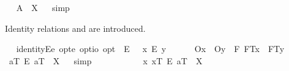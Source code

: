 \begin{isabellebody}
\isanewline
\ \isamarkupfalse%
\ {\isachardoublequoteopen}A{\isacharbang}\ {\isacharequal}\ X{\isachardoublequoteclose}%
\isadelimproof
\ %
\endisadelimproof
%
\isatagproof
{}\isamarkupfalse%
\ simp\ \isamarkupfalse%
\ \ \ \ \ \ \ %
%
\endisatagproof
{\isafoldproof}%
%
\isadelimproof
%
\endisadelimproof
%
\begin{isamarkuptext}%
Identity relations  and \isa{\isactrlbold {\isacharequal}} are introduced.%
\end{isamarkuptext}%
\isamarkuptrue%
\ \isamarkupfalse%
\ identityE{\isacharcolon}{\isacharcolon}{\isachardoublequoteopen}e\ opt{\isasymRightarrow}e\ opt{\isasymRightarrow}io\ opt{\isachardoublequoteclose}\ {\isacharparenleft}\ {\isachardoublequoteopen}\isactrlbold {\isacharequal}\isactrlsub E{\isachardoublequoteclose}\ {}{}{\isacharparenright}\ \ {\isachardoublequoteopen}x\ \isactrlbold {\isacharequal}\isactrlsub E\ y\ {\isasymequiv}\ \isanewline
\ \ \ \ {\isasymlparr}O{\isacharbang}{\isacharcomma}x{\isasymrparr}\ \isactrlbold {\isasymand}\ {\isasymlparr}O{\isacharbang}{\isacharcomma}y{\isasymrparr}\ \isactrlbold {\isasymand}\ \isactrlbold {\isasymbox}{\isacharparenleft}\isactrlbold {\isasymforall}F{\isachardot}\ {\isasymlparr}F\isactrlsup T{\isacharcomma}x{\isasymrparr}\ \isactrlbold {\isasymequiv}\ {\isasymlparr}F\isactrlsup T{\isacharcomma}y{\isasymrparr}{\isacharparenright}{\isachardoublequoteclose}\isanewline
\isanewline
\ \isamarkupfalse%
\ {\isachardoublequoteopen}a\isactrlsup T\ \isactrlbold {\isacharequal}\isactrlsub E\ a\isactrlsup T\ {\isacharequal}\ X{\isachardoublequoteclose}%
\isadelimproof
\ %
\endisadelimproof
%
\isatagproof
{}\isamarkupfalse%
\ simp\ \isamarkupfalse%
\ \ \ \ \ \ %
%
\endisatagproof
{\isafoldproof}%
%
\isadelimproof
%
\endisadelimproof
%
\isamarkuptrue%
\ \isamarkupfalse%
\ {\isachardoublequoteopen}{\isacharparenleft}\isactrlbold {\isasymlambda}\ x{\isachardot}\ x\isactrlsup T\ \isactrlbold {\isacharequal}\isactrlsub E\ a\isactrlsup T{\isacharparenright}\ {\isacharequal}\ X{\isachardoublequoteclose}%

\end{isabellebody}
